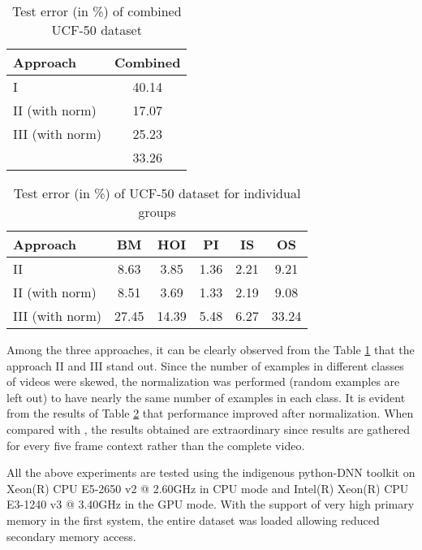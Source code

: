 \begin{table}[htbp]
   \caption{Test error (in \%) of combined UCF-50 dataset}
   \begin{center}
   \begin{tabular}{|l|c|} \hline
        \textbf{Approach}&  \textbf{Combined} \\ \hline
        I & 40.14\\ \hline
		II (with norm) &  17.07 \\ \hline		 
		III (with norm) &  25.23 \\ \hline
		\cite{recognizing50} &  33.26 \\ \hline
   \end{tabular}
   \label{tab:comrecognition}
   \medskip \small 
   \end{center}
 \end{table} 
 
\begin{table}[htbp]
   \caption{Test error (in \%) of UCF-50 dataset for individual groups}
   \begin{center}
   \begin{tabular}{|l|c|c|c|c|c|} \hline
        \textbf{Approach} & \textbf{BM} & \textbf{HOI} & \textbf{PI} & \textbf{IS} & \textbf{OS} \\ \hline
		II & 8.63 & 3.85 & 1.36 & 2.21 & 9.21 \\ \hline
		II (with norm) & 8.51 & 3.69 & 1.33 & 2.19 & 9.08 \\ \hline		 
		III (with norm) & 27.45 & 14.39 & 5.48 & 6.27 & 33.24 \\ \hline
   \end{tabular}
   \label{tab:indirecognition}
   \medskip \small 
   \end{center}
 \end{table} 
  
Among the three approaches, it can be clearly observed from the Table \ref{tab:comrecognition} that the approach II and III  stand out.  Since the number of examples in different classes of videos were skewed, the normalization was performed (random examples are left out) to have nearly the same number of examples in each class.  It is evident from the results of Table \ref{tab:indirecognition} that performance improved after normalization. When compared with \citep{recognizing50}, the results obtained are extraordinary since results are gathered for every five frame context rather than the complete video.
\par All the above experiments are tested using the indigenous python-DNN toolkit on  Xeon(R) CPU E5-2650 v2 @ 2.60GHz in CPU mode and Intel(R) Xeon(R) CPU E3-1240 v3 @ 3.40GHz in the GPU mode. With the support of very high primary memory in  the first system, the entire dataset was loaded allowing reduced secondary memory access.


